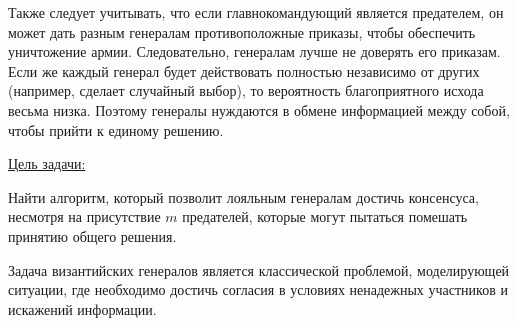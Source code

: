 Также следует учитывать, что если главнокомандующий является предателем, он может дать разным генералам противоположные приказы, чтобы обеспечить уничтожение армии. Следовательно, генералам лучше не доверять его приказам. Если же каждый генерал будет действовать полностью независимо от других (например, сделает случайный выбор), то вероятность благоприятного исхода весьма низка. Поэтому генералы нуждаются в обмене информацией между собой, чтобы прийти к единому решению.~\cite{vakhramov}

\underline{Цель задачи:}

Найти алгоритм, который позволит лояльным генералам достичь консенсуса, несмотря на присутствие $m$ предателей, которые могут пытаться помешать принятию общего решения.

Задача византийских генералов является классической проблемой, моделирующей ситуации, где необходимо достичь согласия в условиях ненадежных участников и искажений информации.

\newpage